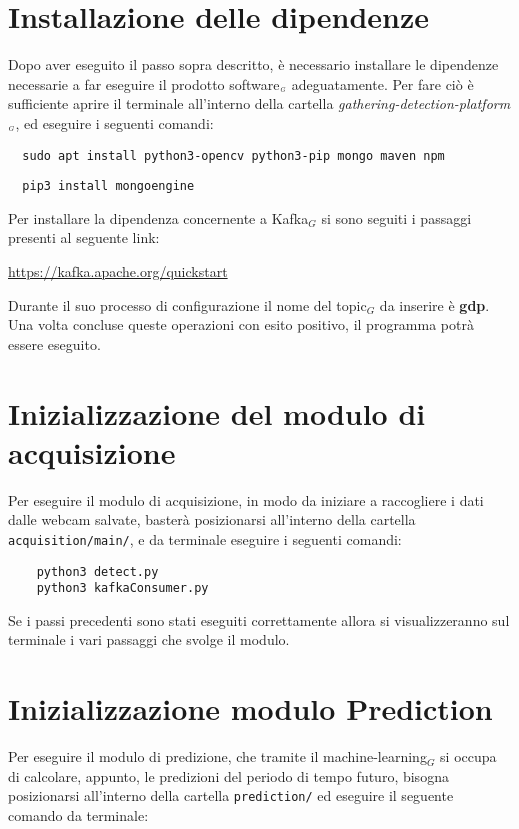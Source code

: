 \section{Installazione delle dipendenze}\label{ProceduraDiInstallazioneInstallazioneDipendenze}
Dopo aver eseguito il passo sopra descritto, è necessario installare le dipendenze necessarie a far eseguire il prodotto software$_{\scaleto{G}{3pt}}$ adeguatamente.
Per fare ciò è sufficiente aprire il terminale all'interno della cartella \textit{gathering-detection-platform$_{\scaleto{G}{3pt}}$}, ed eseguire i seguenti comandi:
\begin{lstlisting}
  sudo apt install python3-opencv python3-pip mongo maven npm
\end{lstlisting}
\begin{lstlisting}
  pip3 install mongoengine
\end{lstlisting}
Per installare la dipendenza concernente a Kafka$_G$ si sono seguiti i passaggi presenti al seguente link:
\begin{centering}
    \url{https://kafka.apache.org/quickstart}
\end{centering}

Durante il suo processo di configurazione il nome del topic$_G$ da inserire è \textbf{gdp}.
Una volta concluse queste operazioni con esito positivo, il programma potrà essere eseguito.

\section{Inizializzazione del modulo di acquisizione}\label{ProceduraDiInstallazioneInizializzazioneModuloAcquisition}
Per eseguire il modulo di acquisizione, in modo da iniziare a raccogliere i dati dalle webcam salvate, basterà posizionarsi all'interno della cartella \texttt{acquisition/main/}, e da terminale eseguire i seguenti comandi:
\begin{lstlisting}
    python3 detect.py
    python3 kafkaConsumer.py
\end{lstlisting}
Se i passi precedenti sono stati eseguiti correttamente allora si visualizzeranno sul terminale i vari passaggi che svolge il modulo.



\section{Inizializzazione modulo Prediction}\label{ProceduraDiInstallazioneInizializzazioneModuloPrediction}
Per eseguire il modulo di predizione, che tramite il machine-learning$_G$ si occupa di calcolare, appunto, le predizioni del periodo di tempo futuro, bisogna posizionarsi all'interno della cartella \texttt{prediction/} ed eseguire il seguente comando da terminale:

